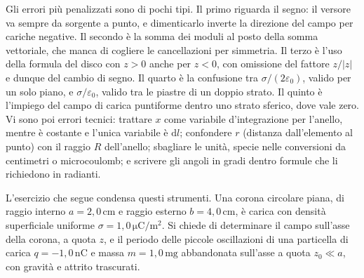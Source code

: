\documentclass[11pt,a4paper]{article}
\newcommand{\dd}{\mathrm{d}}
\newcommand{\epz}{\varepsilon_0}
\begin{document}
Gli errori più penalizzati sono di pochi tipi. Il primo riguarda il segno: il versore va sempre da sorgente a punto, e dimenticarlo inverte la direzione del campo per cariche negative. Il secondo è la somma dei moduli al posto della somma vettoriale, che manca di cogliere le cancellazioni per simmetria. Il terzo è l'uso della formula del disco con $z>0$ anche per $z<0$, con omissione del fattore $z/|z|$ e dunque del cambio di segno. Il quarto è la confusione tra $\sigma/(2\epz)$, valido per un solo piano, e $\sigma/\epz$, valido tra le piastre di un doppio strato. Il quinto è l'impiego del campo di carica puntiforme dentro uno strato sferico, dove vale zero. Vi sono poi errori tecnici: trattare $x$ come variabile d'integrazione per l'anello, mentre è costante e l'unica variabile è $\dd l$; confondere $r$ (distanza dall'elemento al punto) con il raggio $R$ dell'anello; sbagliare le unità, specie nelle conversioni da centimetri o microcoulomb; e scrivere gli angoli in gradi dentro formule che li richiedono in radianti.

L'esercizio che segue condensa questi strumenti. Una corona circolare piana, di raggio interno $a=\ensuremath{2,0\,\mathrm{cm}}$ e raggio esterno $b=\ensuremath{4,0\,\mathrm{cm}}$, è carica con densità superficiale uniforme $\sigma=\ensuremath{1,0\,\mathrm{\mu C/m^2}}$. Si chiede di determinare il campo sull'asse della corona, a quota $z$, e il periodo delle piccole oscillazioni di una particella di carica $q=-\ensuremath{1,0\,\mathrm{nC}}$ e massa $m=\ensuremath{1,0\,\mathrm{mg}}$ abbandonata sull'asse a quota $z_0\ll a$, con gravità e attrito trascurati.
\end{document}
